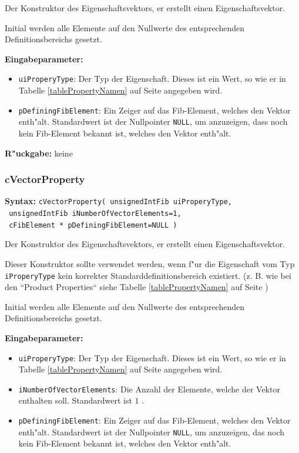 \bigskip\noindent
Der Konstruktor des Eigenschaftsvektors, er erstellt einen Eigenschaftsvektor.

Initial werden alle Elemente auf den Nullwerte des entsprechenden Definitionsbereichs gesetzt.

\bigskip\noindent
\textbf{Eingabeparameter:}
\begin{itemize}
 \item \verb|uiProperyType|: Der Typ der Eigenschaft. Dieses ist ein Wert, so wie er in Tabelle \ref{tablePropertyNamen} auf Seite \pageref{tablePropertyNamen} angegeben wird.
 \item \verb|pDefiningFibElement|: Ein Zeiger auf das Fib-Element, welches den Vektor enth"alt. Standardwert ist der Nullpointer \verb|NULL|, um anzuzeigen, dass noch kein Fib-Element bekannt ist, welches den Vektor enth"alt.
\end{itemize}

\bigskip\noindent
\textbf{R"uckgabe:} keine


\subsubsection{cVectorProperty}

\textbf{Syntax:} \verb|cVectorProperty( unsignedIntFib uiProperyType,| \\\verb| unsignedIntFib iNumberOfVectorElements=1,| \\\verb| cFibElement * pDefiningFibElement=NULL )|

\bigskip\noindent
Der Konstruktor des Eigenschaftsvektors, er erstellt einen Eigenschaftsvektor.

Dieser Konstruktor sollte verwendet werden, wenn f"ur die Eigenschaft vom Typ \verb|iProperyType| kein korrekter Standarddefinitionsbereich existiert. (z. B. wie bei den ``Product Properties`` siehe Tabelle \ref{tablePropertyNamen} auf Seite \pageref{tablePropertyNamen})

Initial werden alle Elemente auf den Nullwerte des entsprechenden Definitionsbereichs gesetzt.

\bigskip\noindent
\textbf{Eingabeparameter:}
\begin{itemize}
 \item \verb|uiProperyType|: Der Typ der Eigenschaft. Dieses ist ein Wert, so wie er in Tabelle \ref{tablePropertyNamen} auf Seite \pageref{tablePropertyNamen} angegeben wird.
 \item \verb|iNumberOfVectorElements|: Die Anzahl der Elemente, welche der Vektor enthalten soll. Standardwert ist $1$ .
 \item \verb|pDefiningFibElement|: Ein Zeiger auf das Fib-Element, welches den Vektor enth"alt. Standardwert ist der Nullpointer \verb|NULL|, um anzuzeigen, das noch kein Fib-Element bekannt ist, welches den Vektor enth"alt.
\end{itemize}

